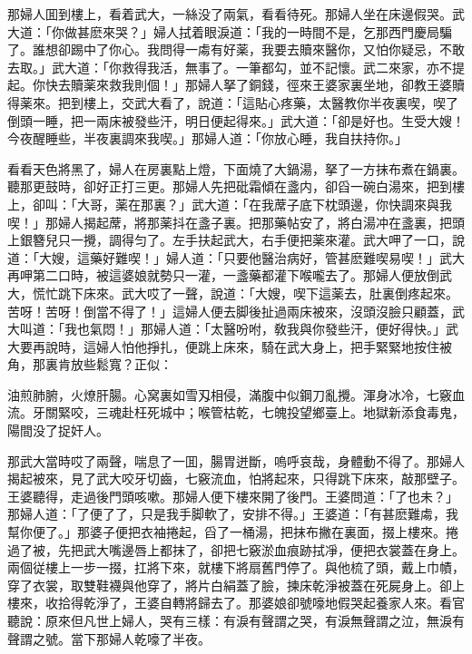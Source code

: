 那婦人囬到樓上，看着武大，一絲没了兩氣，看看待死。那婦人坐在床邊假哭。武大道：「你做甚麽來哭？」婦人拭着眼淚道：「我的一時間不是，乞那西門慶局騙了。誰想卻踢中了你心。我問得一䖏有好薬，我要去贖來醫你，又怕你疑忌，不敢去取。」武大道：「你救得我活，無事了。一筆都勾，並不記懷。武二來家，亦不提起。你快去贖薬來救我則個！」那婦人拏了銅錢，徑來王婆家裏坐地，卻教王婆贖得薬來。把到樓上，交武大看了，說道：「這貼心疼藥，太醫教你半夜裏喫，喫了倒頭一睡，把一兩床被發些汗，明日便起得來。」武大道：「卻是好也。生受大嫂！今夜醒睡些，半夜裏調來我喫。」那婦人道：「你放心睡，我自扶持你。」

看看天色將黑了，婦人在房裏點上燈，下面燒了大鍋湯，拏了一方抹布煮在鍋裏。聽那更鼓時，卻好正打三更。那婦人先把砒霜傾在盞内，卻舀一碗白湯來，把到樓上，卻叫：「大哥，薬在那裏？」武大道：「在我蓆子底下枕頭邊，你快調來與我喫！」那婦人揭起蓆，將那薬抖在盞子裏。把那藥帖安了，將白湯冲在盞裏，把頭上銀簪兒只一攪，調得匀了。左手扶起武大，右手便把薬來灌。武大呷了一口，說道：「大嫂，這藥好難喫！」婦人道：「只要他醫治病好，管甚麽難喫易喫！」武大再呷第二口時，被這婆娘就勢只一灌，一盞藥都灌下喉嚨去了。那婦人便放倒武大，慌忙跳下床來。武大哎了一聲，說道：「大嫂，喫下這薬去，肚裏倒疼起來。苦呀！苦呀！倒當不得了！」這婦人便去脚後扯過兩床被來，沒頭沒臉只顧蓋，武大叫道：「我也氣悶！」那婦人道：「太醫吩咐，敎我與你發些汗，便好得快。」武大要再說時，這婦人怕他掙扎，便跳上床來，騎在武大身上，把手緊緊地按住被角，那裏肯放些鬆寬？正似：
\begin{myquote}
油煎肺腑，火燎肝腸。心窝裏如雪刄相侵，滿腹中似鋼刀亂攪。渾身冰冷，七竅血流。牙關緊咬，三魂赴枉死城中；喉管枯乾，七魄投望鄉臺上。地獄新添食毒鬼，陽間没了捉奸人。
\end{myquote}

那武大當時哎了兩聲，喘息了一囬，腸胃迸斷，嗚呼哀哉，身體動不得了。那婦人揭起被來，見了武大咬牙切齒，七竅流血，怕將起來，只得跳下床來，敲那壁子。王婆聽得，走過後門頭咳嗽。那婦人便下樓來開了後門。王婆問道：「了也未？」那婦人道：「了便了了，只是我手脚軟了，安排不得。」王婆道：「有甚麽難䖏，我幫你便了。」那婆子便把衣袖捲起，舀了一桶湯，把抹布撇在裏面，掇上樓來。捲過了被，先把武大嘴邊唇上都抹了，卻把七竅淤血痕跡拭凈，便把衣裳蓋在身上。兩個従樓上一步一掇，扛將下來，就樓下將扇舊門停了。與他梳了頭，戴上巾幘，穿了衣裳，取雙鞋襪與他穿了，將片白絹蓋了臉，揀床乾淨被蓋在死屍身上。卻上樓來，收拾得乾淨了，王婆自轉將歸去了。那婆娘卻號嚎地假哭起養家人來。看官聽說：原來但凡世上婦人，哭有三樣：有淚有聲謂之哭，有淚無聲謂之泣，無淚有聲謂之號。當下那婦人乾嚎了半夜。

